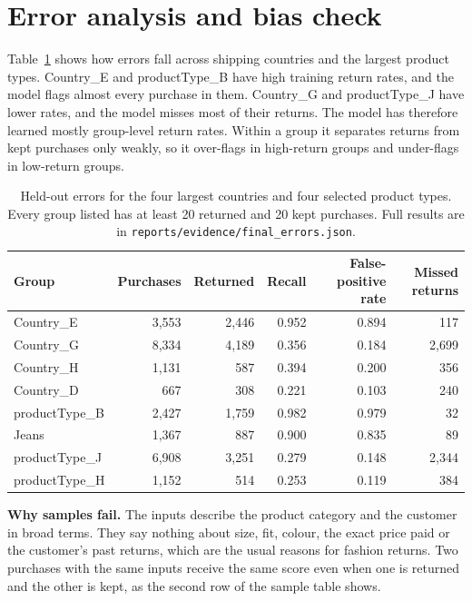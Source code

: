 \documentclass[11pt,a4paper]{article}
\begin{document}
\section{Error analysis and bias check}
Table~\ref{tab:groups} shows how errors fall across shipping countries and the largest product types. Country\_E and productType\_B have high training return rates, and the model flags almost every purchase in them. Country\_G and productType\_J have lower rates, and the model misses most of their returns. The model has therefore learned mostly group-level return rates. Within a group it separates returns from kept purchases only weakly, so it over-flags in high-return groups and under-flags in low-return groups.

\begin{table}[H]\centering\small
\begin{tabularx}{\linewidth}{Xrrrrr}
\toprule Group & Purchases & Returned & Recall & False-positive rate & Missed returns\\ \midrule
Country\_E & 3,553 & 2,446 & 0.952 & 0.894 & 117\\
Country\_G & 8,334 & 4,189 & 0.356 & 0.184 & 2,699\\
Country\_H & 1,131 & 587 & 0.394 & 0.200 & 356\\
Country\_D & 667 & 308 & 0.221 & 0.103 & 240\\ \midrule
productType\_B & 2,427 & 1,759 & 0.982 & 0.979 & 32\\
Jeans & 1,367 & 887 & 0.900 & 0.835 & 89\\
productType\_J & 6,908 & 3,251 & 0.279 & 0.148 & 2,344\\
productType\_H & 1,152 & 514 & 0.253 & 0.119 & 384\\ \bottomrule
\end{tabularx}
\caption{Held-out errors for the four largest countries and four selected product types. Every group listed has at least 20 returned and 20 kept purchases. Full results are in \texttt{reports/evidence/final\_errors.json}.}
\label{tab:groups}
\end{table}

\textbf{Why samples fail.} The inputs describe the product category and the customer in broad terms. They say nothing about size, fit, colour, the exact price paid or the customer's past returns, which are the usual reasons for fashion returns. Two purchases with the same inputs receive the same score even when one is returned and the other is kept, as the second row of the sample table shows.
\end{document}
